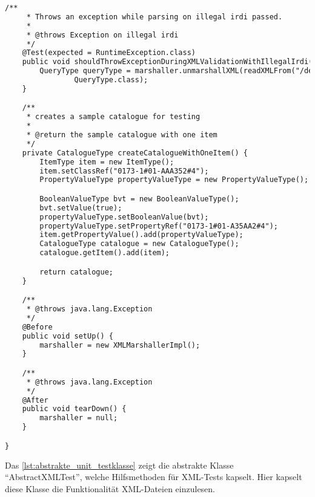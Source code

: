 \begin{lstlisting}[caption=Beispiel eines Unit Tests, language=XML, label=lst:unittest_beispiel]
    /**
     * Throws an exception while parsing on illegal irdi passed.
     *
     * @throws Exception on illegal irdi
     */
    @Test(expected = RuntimeException.class)
    public void shouldThrowExceptionDuringXMLValidationWithIllegalIrdi() throws Exception {
        QueryType queryType = marshaller.unmarshallXML(readXMLFrom("/de/feu/plib/xml/query_class_irdi_illegal.xml"),
                QueryType.class);
    }

    /**
     * creates a sample catalogue for testing
     * 
     * @return the sample catalogue with one item
     */
    private CatalogueType createCatalogueWithOneItem() {
        ItemType item = new ItemType();
        item.setClassRef("0173-1#01-AAA352#4");
        PropertyValueType propertyValueType = new PropertyValueType();

        BooleanValueType bvt = new BooleanValueType();
        bvt.setValue(true);
        propertyValueType.setBooleanValue(bvt);
        propertyValueType.setPropertyRef("0173-1#01-A35AA2#4");
        item.getPropertyValue().add(propertyValueType);
        CatalogueType catalogue = new CatalogueType();
        catalogue.getItem().add(item);

        return catalogue;
    }

    /**
     * @throws java.lang.Exception
     */
    @Before
    public void setUp() {
        marshaller = new XMLMarshallerImpl();
    }

    /**
     * @throws java.lang.Exception
     */
    @After
    public void tearDown() {
        marshaller = null;
    }

}
\end{lstlisting}  

Das \autoref{lst:abstrakte_unit_testklasse} zeigt die abstrakte Klasse \enquote{AbstractXMLTest}, welche Hilfsmethoden für XML-Tests kapselt. Hier kapselt diese Klasse die Funktionalität XML-Dateien einzulesen.  

